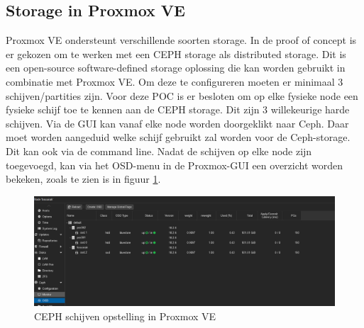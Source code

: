 \subsection{Storage in Proxmox VE}
Proxmox VE ondersteunt verschillende soorten storage. In de proof of concept is er gekozen om te werken met een CEPH storage als distributed storage. Dit is een open-source software-defined storage oplossing die kan worden gebruikt in combinatie met Proxmox VE.
Om deze te configureren moeten er minimaal 3 schijven/partities zijn. Voor deze POC is er besloten om op elke fysieke node een fysieke schijf toe te kennen aan de CEPH storage. Dit zijn 3 willekeurige harde schijven.
Via de GUI kan vanaf elke node worden doorgeklikt naar Ceph. Daar moet worden aangeduid welke schijf gebruikt zal worden voor de Ceph-storage. Dit kan ook via de command line.
Nadat de schijven op elke node zijn toegevoegd, kan via het OSD-menu in de Proxmox-GUI een overzicht worden bekeken, zoals te zien is in figuur \ref{fig:osd-ceph-proxmox}.
\begin{figure}[H]
  \centering
  \includegraphics[width=1.2\textwidth]{../poc/ceph-osd-prox.png}
  \caption{CEPH schijven opstelling in Proxmox VE}
  \label{fig:osd-ceph-proxmox}
\end{figure}

